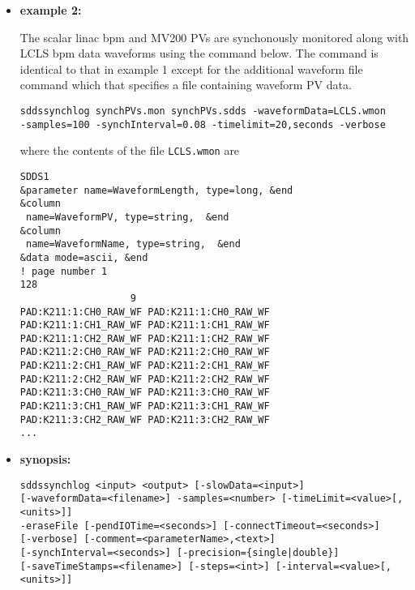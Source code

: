 \begin{itemize}
\begin{verbatim}
\end{verbatim}
\item {\bf example 2:} 
%
% 
%

The scalar linac bpm and MV200 PVs are synchonously monitored along
with LCLS bpm data waveforms using the command below.  The command is
identical to that in example 1 except for the additional waveform file
command which that specifies a file containing waveform PV data.
\begin{verbatim}
sddssynchlog synchPVs.mon synchPVs.sdds -waveformData=LCLS.wmon
-samples=100 -synchInterval=0.08 -timelimit=20,seconds -verbose
\end{verbatim}
where the contents of the file \verb+LCLS.wmon+ are
\begin{verbatim}
SDDS1
&parameter name=WaveformLength, type=long, &end
&column
 name=WaveformPV, type=string,  &end
&column
 name=WaveformName, type=string,  &end
&data mode=ascii, &end
! page number 1
128
                   9
PAD:K211:1:CH0_RAW_WF PAD:K211:1:CH0_RAW_WF 
PAD:K211:1:CH1_RAW_WF PAD:K211:1:CH1_RAW_WF 
PAD:K211:1:CH2_RAW_WF PAD:K211:1:CH2_RAW_WF 
PAD:K211:2:CH0_RAW_WF PAD:K211:2:CH0_RAW_WF 
PAD:K211:2:CH1_RAW_WF PAD:K211:2:CH1_RAW_WF 
PAD:K211:2:CH2_RAW_WF PAD:K211:2:CH2_RAW_WF 
PAD:K211:3:CH0_RAW_WF PAD:K211:3:CH0_RAW_WF 
PAD:K211:3:CH1_RAW_WF PAD:K211:3:CH1_RAW_WF 
PAD:K211:3:CH2_RAW_WF PAD:K211:3:CH2_RAW_WF 
...
\end{verbatim}
\item {\bf synopsis:} 
%
%
\begin{verbatim}
sddssynchlog <input> <output> [-slowData=<input>]
[-waveformData=<filename>] -samples=<number> [-timeLimit=<value>[,<units>]]
-eraseFile [-pendIOTime=<seconds>] [-connectTimeout=<seconds>]
[-verbose] [-comment=<parameterName>,<text>]
[-synchInterval=<seconds>] [-precision={single|double}]
[-saveTimeStamps=<filename>] [-steps=<int>] [-interval=<value>[,<units>]] 


\end{verbatim}
\end{itemize}
